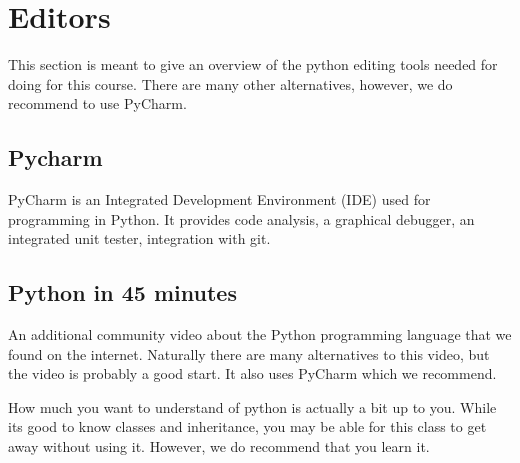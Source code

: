 \section{Editors}\label{introduction}

This section is meant to give an overview of the python editing tools needed for doing for this course. There are many other alternatives, however, we do recommend to use PyCharm.

\subsection{Pycharm}\label{s:pycharm}

PyCharm is an Integrated Development Environment (IDE) used for programming in
Python. It provides code analysis, a graphical debugger, an integrated
unit tester, integration with git.


\subsection{Python in 45 minutes}\label{python-in-45-minutes}

An additional community video about the Python programming language that
we found on the internet. Naturally there are many alternatives to this
video, but the video is probably a good start. It also uses PyCharm
which we recommend.


How much you want to understand of python is actually a bit up to you.
While its good to know classes and inheritance, you may be able for this
class to get away without using it. However, we do recommend that you
learn it.

